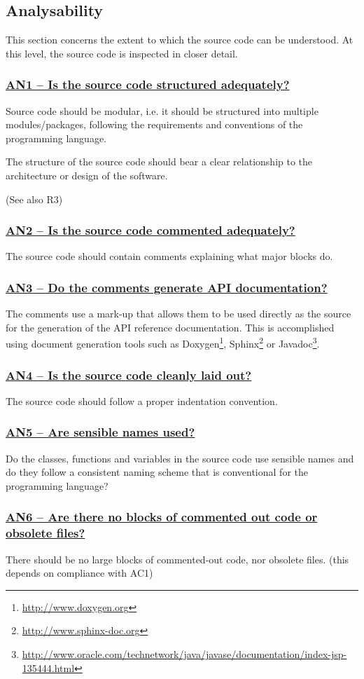\documentclass[a4paper,11pt]{article}
\newcommand{\indicator}[1]{\subsubsection*{\underline{#1}}}
\begin{document}
\subsection{Analysability}

This section concerns the extent to which the source code can be understood. At
this level, the source code is inspected in closer detail.

\indicator{AN1 -- Is the source code structured adequately?}

Source code should be modular, i.e. it should be structured into multiple
modules/packages, following the requirements and conventions of the programming
language. 

The structure of the source code should bear a clear relationship to the
architecture or design of the software.

(See also R3)

\indicator{AN2 -- Is the source code commented adequately?}

The source code should contain comments explaining what major blocks do.

\indicator{AN3 -- Do the comments generate API documentation?}

The comments use a mark-up that allows them to be used directly as the
source for the generation of the API reference documentation. This is
%
%
%
accomplished using document generation tools such as Doxygen\footnote{\url{http://www.doxygen.org}}, Sphinx\footnote{\url{http://www.sphinx-doc.org}} or
Javadoc\footnote{\url{http://www.oracle.com/technetwork/java/javase/documentation/index-jsp-135444.html}}.

\indicator{AN4 -- Is the source code cleanly laid out?}

The source code should follow a proper indentation convention. 

\indicator{AN5 -- Are sensible names used?}

Do the classes, functions and variables in the source code use sensible names
and do they follow a consistent naming scheme that is conventional for the
programming language?

\indicator{AN6 -- Are there no blocks of commented out code or obsolete files?}

There should be no large blocks of commented-out code, nor obsolete files.
(this depends on compliance with AC1)
\end{document}
